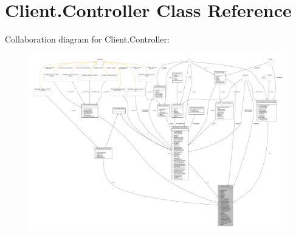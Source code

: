 \hypertarget{classClient_1_1Controller}{}\section{Client.\+Controller Class Reference}
\label{classClient_1_1Controller}


Collaboration diagram for Client.\+Controller\+:
\nopagebreak
\begin{figure}[H]
\begin{center}
\leavevmode
\includegraphics[width=350pt]{classClient_1_1Controller__coll__graph}
\end{center}
\end{figure}
